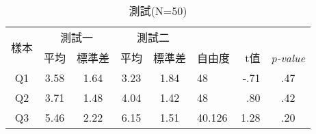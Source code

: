 \begin{table}[htbp]
\centering
\caption{測試(N=50)}
\label{t:b}
\begin{adjustbox}{max width=\textwidth}
\begin{tabular}{@{}ccccclrc@{}}
\toprule
 \multirow{2}[3]{*}{樣本} & \multicolumn{2}{c}{測試一} & \multicolumn{2}{c}{測試二} &  &  &  \\ \cmidrule(lr){2-5}
 & 平均 & 標準差 & 平均 & 標準差 & 自由度 & t值 & \textit{p-value} \\ \midrule
Q1 & 3.58 & 1.64 & 3.23 & 1.84 & 48 & -.71 & .47 \\
Q2 & 3.71 & 1.48 & 4.04 & 1.42 & 48 & .80 & .42 \\
Q3 & 5.46 & 2.22 & 6.15 & 1.51 & 40.126 & 1.28 & .20 \\ \bottomrule
\end{tabular}
\end{adjustbox}
\end{table}